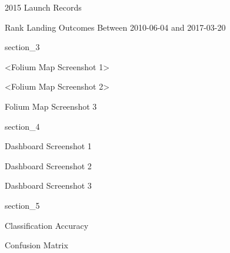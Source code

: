 \begin{frame}{2015 Launch Records}

\end{frame}

\begin{frame}{Rank Landing Outcomes Between 2010-06-04 and 2017-03-20}

\end{frame}

{
{section_3}
\begin{frame}[plain]
\end{frame}
}

\begin{frame}{<Folium Map Screenshot 1>}

\end{frame}

\begin{frame}{<Folium Map Screenshot 2>}

\end{frame}

\begin{frame}{Folium Map Screenshot 3}

\end{frame}

{
{section_4}
\begin{frame}[plain]
\end{frame}
}

\begin{frame}{Dashboard Screenshot 1}

\end{frame}

\begin{frame}{Dashboard Screenshot 2}

\end{frame}

\begin{frame}{Dashboard Screenshot 3}

\end{frame}

{
{section_5}
\begin{frame}[plain]
\end{frame}
}

\begin{frame}{Classification Accuracy}

\end{frame}

\begin{frame}{Confusion Matrix}

\end{frame}

